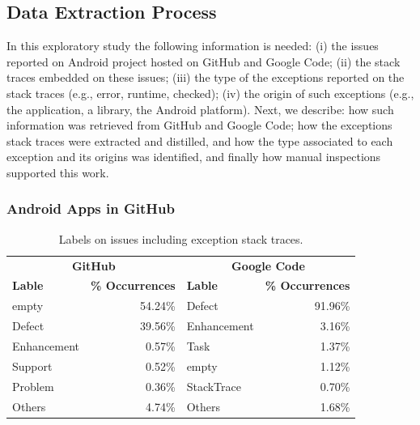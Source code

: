 \documentclass[conference]{IEEEtran}
\begin{document}
\subsection{Data Extraction Process}
\label{sec:miningproc}

In this exploratory study the following information is needed: (i) the issues reported on Android project hosted on 
GitHub and Google Code; (ii) the stack traces embedded on these issues; (iii) the type of the exceptions
 reported on the stack traces (e.g., error, runtime, checked); (iv) the origin of such exceptions 
(e.g., the application, a library, the Android platform). Next, we describe: how such information 
was retrieved from GitHub and Google Code; how the exceptions stack traces were extracted and distilled,
 and how the type associated to each exception and its origins was identified, and finally how manual
inspections supported this work.


\subsubsection{Android Apps in GitHub}
\label{sec:git}


\begin{table}
  \centering
  \begin{tabular}{lr|lr}
    \hline
     \multicolumn{2}{c}{\bfseries{GitHub}} &  \multicolumn{2}{c}{\bfseries{Google Code}} \\
      \bfseries{Lable} &  \bfseries{\% Occurrences} &  \bfseries{Lable} &  \bfseries{\% Occurrences} \\
    \hline
empty &	54.24\% & Defect &	91.96\% \\
Defect &	39.56\%  & Enhancement  &	3.16\% \\
Enhancement &	0.57\% & Task	& 1.37\% \\
Support &	0.52\% & empty &	1.12\% \\
Problem &	0.36\% & StackTrace &	0.70\% \\
Others &	4.74\% &  Others &	1.68\% \\   
  \hline
  \end{tabular}
  \caption{Labels on issues including exception stack traces.}
  \label{tab:lables}
\end{table}
\end{document}
